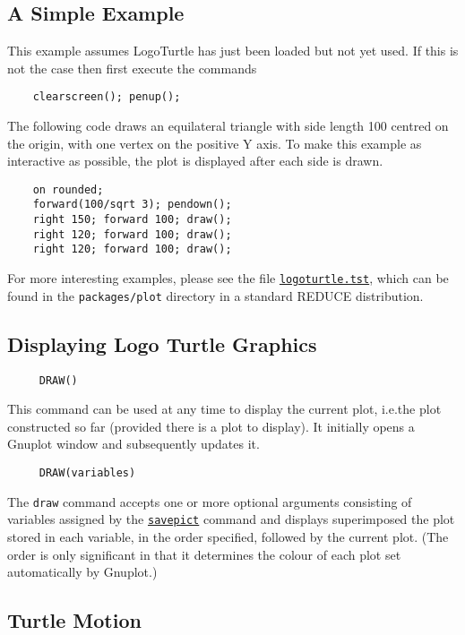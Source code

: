 \subsection{A Simple Example}

This example assumes LogoTurtle has just been loaded but not yet used.
If this is not the case then first execute the commands
\begin{verbatim}
    clearscreen(); penup();
\end{verbatim}

The following code draws an equilateral triangle with side length 100
centred on the origin, with one vertex on the positive Y axis.  To
make this example as interactive as possible, the plot is displayed
after each side is drawn.
\begin{verbatim}
    on rounded;
    forward(100/sqrt 3); pendown();
    right 150; forward 100; draw();
    right 120; forward 100; draw();
    right 120; forward 100; draw();
\end{verbatim}

For more interesting examples, please see the file
\href{https://sourceforge.net/p/reduce-algebra/code/HEAD/tree/trunk/packages/plot/logoturtle.tst}{\texttt{logoturtle.tst}},
which can be found in the \texttt{packages/plot} directory in a
standard REDUCE distribution.


\subsection{Displaying Logo Turtle Graphics}

\begin{verbatim}
     DRAW()
\end{verbatim}
\label{logoturtle:draw}
This command can be used at any time to display the current plot,
i.e.\@ the plot constructed so far (provided there is a plot to
display).  It initially opens a Gnuplot window and subsequently
updates it.

\begin{verbatim}
     DRAW(variables)
\end{verbatim}
The \texttt{draw} command accepts one or more optional arguments
consisting of variables assigned by the
\hyperref[logoturtle:savepict]{\texttt{savepict}} command and
displays superimposed the plot stored in each variable, in the order
specified, followed by the current plot.  (The order is only
significant in that it determines the colour of each plot set
automatically by Gnuplot.)


\subsection{Turtle Motion}

